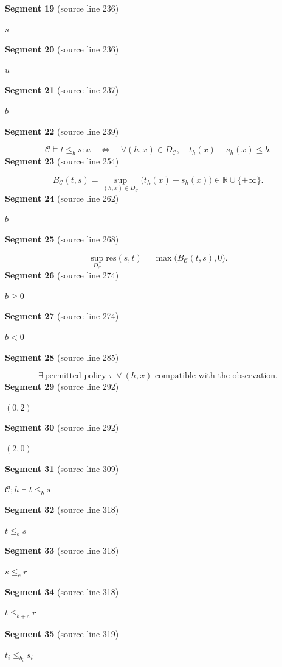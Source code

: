 \documentclass[11pt]{article}
\begin{document}
\textbf{Segment 19} (source line 236)\par
\( s \)\par
\textbf{Segment 20} (source line 236)\par
\( u \)\par
\textbf{Segment 21} (source line 237)\par
\( b \)\par
\textbf{Segment 22} (source line 239)\par
\[
\mathcal C\models t\le_b s:u
\quad\Longleftrightarrow\quad
\forall(h,x)\in D_{\mathcal C},\quad t_h(x)-s_h(x)\le b.
\tag{1}
\]
\textbf{Segment 23} (source line 254)\par
\[
B_{\mathcal C}(t,s)
 =\sup_{(h,x)\in D_{\mathcal C}}\bigl(t_h(x)-s_h(x)\bigr)
 \in\mathbb R\cup\{+\infty\}.
\tag{2}
\]
\textbf{Segment 24} (source line 262)\par
\( b \)\par
\textbf{Segment 25} (source line 268)\par
\[
\sup_{D_{\mathcal C}}\mathrm{res}(s,t)
 =\max\bigl(B_{\mathcal C}(t,s),0\bigr).
\tag{3}
\]
\textbf{Segment 26} (source line 274)\par
\( b\ge0 \)\par
\textbf{Segment 27} (source line 274)\par
\( b<0 \)\par
\textbf{Segment 28} (source line 285)\par
\[
\exists\ \text{permitted policy }\pi\;
\forall\ (h,x)\text{ compatible with the observation}.
\tag{4}
\]
\textbf{Segment 29} (source line 292)\par
\( (0,2) \)\par
\textbf{Segment 30} (source line 292)\par
\( (2,0) \)\par
\textbf{Segment 31} (source line 309)\par
\( \mathcal C;h\vdash t\le_b s \)\par
\textbf{Segment 32} (source line 318)\par
\( t\le_b s \)\par
\textbf{Segment 33} (source line 318)\par
\( s\le_c r \)\par
\textbf{Segment 34} (source line 318)\par
\( t\le_{b+c}r \)\par
\textbf{Segment 35} (source line 319)\par
\( t_i\le_{b_i}s_i \)\par
\end{document}

